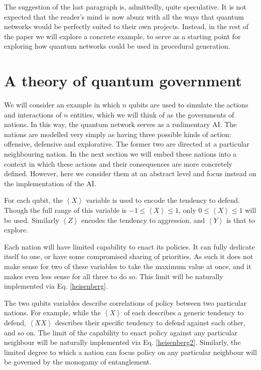 \documentclass[conference]{IEEEtran}
\begin{document}
The suggestion of the last paragraph is, admittedly, quite speculative. It is not expected that the reader's mind is now abuzz with all the ways that quantum networks would be perfectly suited to their own projects. Instead, in the rest of the paper we will explore a concrete example, to serve as a starting point for exploring how quantum networks could be used in procedural generation.

\section{A theory of quantum government}

We will consider an example in which $n$ qubits are used to simulate the actions and interactions of $n$ entities, which we will think of as the governments of nations. In this way, the quantum network serves as a rudimentary AI. The nations are modelled very simply as having three possible kinds of action: offensive, defensive and explorative. The former two are directed at a particular neighbouring nation. In the next section we will embed these nations into a context in which these actions and their consequences are more concretely defined. However, here we consider them at an abstract level and focus instead on the implementation of the AI.

For each qubit, the $\left\langle X\right\rangle$ variable is used to encode the tendency to defend. Though the full range of this variable is $-1 \leq \left\langle X\right\rangle \leq 1$, only $0 \leq \left\langle X\right\rangle \leq 1$ will be used. Similarly $\left\langle Z\right\rangle$ encodes the tendency to aggression, and $\left\langle Y\right\rangle$ is that to explore.

Each nation will have limited capability to enact its policies. It can fully dedicate itself to one, or have some compromised sharing of priorities. As such it does not make sense for two of these variables to take the maximum value at once, and it makes even less sense for all three to do so. This limit will be naturally implemented via Eq. \ref{heisenberg}.

The two qubits variables describe correlations of policy between two particular nations. For example, while the $\left\langle X\right\rangle$ of each describes a generic tendency to defend, $\left\langle XX\right\rangle$ describes their specific tendency to defend against each other, and so on. The limit of the capability to enact policy against any particular neighbour will be naturally implemented via  Eq. \ref{heisenberg2}. Similarly, the limited degree to which a nation can focus policy on any particular neighbour will be governed by the monogamy of entanglement.
\end{document}
